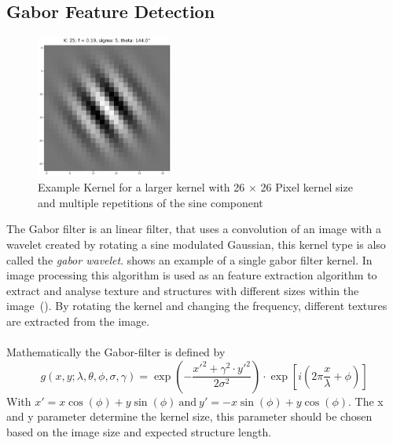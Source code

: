 \documentclass[12pt,a4paper, english,twoside]{article}
\begin{document}
  \subsection{Gabor Feature Detection}\label{sec:gabor}
  \begin{figure}
    \vspace{-1cm}
       \begin{center}
         \includegraphics[width=0.4\textwidth]{img/KLarge.png}
       \end{center}
       \caption{Example Kernel for a larger kernel with 26 $\times$ 26 Pixel kernel size and multiple repetitions of the sine component}\label{fig:largeKernel}
      \end{figure}
    The Gabor filter is an linear filter, that uses a convolution of an image with a wavelet created by rotating a sine modulated Gaussian, this kernel type is also called the \textit{gabor wavelet}. 
     shows an example of a single gabor filter kernel.
    In image processing this algorithm is used as an feature extraction algorithm to extract and analyse texture and structures with different sizes within the image~(\autocite{Cerdan1993}). 
    By rotating the kernel and changing the frequency, different textures are extracted from the image.\\ \\
    Mathematically the Gabor-filter is defined by
    \begin{equation}
      g(x,y; \lambda, \theta, \phi, \sigma, \gamma) = \exp \left(- \frac{x'^2 + \gamma^2\cdot y'^2}{2\sigma^2}\right) \cdot \exp \left[i \left(2\pi\frac{x}{\lambda} + \phi \right)\right] 
    \end{equation}
    With $ x' = x \cos(\phi) + y \sin(\phi)~\text{and}~y' = -x \sin(\phi) + y \cos(\phi)$.
    The x and y parameter determine the kernel size, this parameter should be chosen based on the image size and expected structure length.\\
\end{document}

